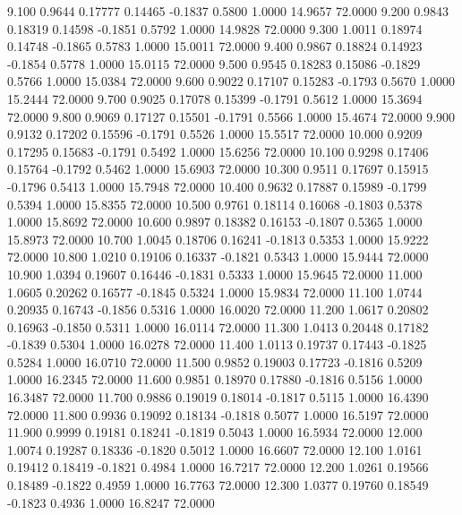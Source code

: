    9.100   0.9644   0.17777   0.14465  -0.1837   0.5800   1.0000  14.9657  72.0000
   9.200   0.9843   0.18319   0.14598  -0.1851   0.5792   1.0000  14.9828  72.0000
   9.300   1.0011   0.18974   0.14748  -0.1865   0.5783   1.0000  15.0011  72.0000
   9.400   0.9867   0.18824   0.14923  -0.1854   0.5778   1.0000  15.0115  72.0000
   9.500   0.9545   0.18283   0.15086  -0.1829   0.5766   1.0000  15.0384  72.0000
   9.600   0.9022   0.17107   0.15283  -0.1793   0.5670   1.0000  15.2444  72.0000
   9.700   0.9025   0.17078   0.15399  -0.1791   0.5612   1.0000  15.3694  72.0000
   9.800   0.9069   0.17127   0.15501  -0.1791   0.5566   1.0000  15.4674  72.0000
   9.900   0.9132   0.17202   0.15596  -0.1791   0.5526   1.0000  15.5517  72.0000
  10.000   0.9209   0.17295   0.15683  -0.1791   0.5492   1.0000  15.6256  72.0000
  10.100   0.9298   0.17406   0.15764  -0.1792   0.5462   1.0000  15.6903  72.0000
  10.300   0.9511   0.17697   0.15915  -0.1796   0.5413   1.0000  15.7948  72.0000
  10.400   0.9632   0.17887   0.15989  -0.1799   0.5394   1.0000  15.8355  72.0000
  10.500   0.9761   0.18114   0.16068  -0.1803   0.5378   1.0000  15.8692  72.0000
  10.600   0.9897   0.18382   0.16153  -0.1807   0.5365   1.0000  15.8973  72.0000
  10.700   1.0045   0.18706   0.16241  -0.1813   0.5353   1.0000  15.9222  72.0000
  10.800   1.0210   0.19106   0.16337  -0.1821   0.5343   1.0000  15.9444  72.0000
  10.900   1.0394   0.19607   0.16446  -0.1831   0.5333   1.0000  15.9645  72.0000
  11.000   1.0605   0.20262   0.16577  -0.1845   0.5324   1.0000  15.9834  72.0000
  11.100   1.0744   0.20935   0.16743  -0.1856   0.5316   1.0000  16.0020  72.0000
  11.200   1.0617   0.20802   0.16963  -0.1850   0.5311   1.0000  16.0114  72.0000
  11.300   1.0413   0.20448   0.17182  -0.1839   0.5304   1.0000  16.0278  72.0000
  11.400   1.0113   0.19737   0.17443  -0.1825   0.5284   1.0000  16.0710  72.0000
  11.500   0.9852   0.19003   0.17723  -0.1816   0.5209   1.0000  16.2345  72.0000
  11.600   0.9851   0.18970   0.17880  -0.1816   0.5156   1.0000  16.3487  72.0000
  11.700   0.9886   0.19019   0.18014  -0.1817   0.5115   1.0000  16.4390  72.0000
  11.800   0.9936   0.19092   0.18134  -0.1818   0.5077   1.0000  16.5197  72.0000
  11.900   0.9999   0.19181   0.18241  -0.1819   0.5043   1.0000  16.5934  72.0000
  12.000   1.0074   0.19287   0.18336  -0.1820   0.5012   1.0000  16.6607  72.0000
  12.100   1.0161   0.19412   0.18419  -0.1821   0.4984   1.0000  16.7217  72.0000
  12.200   1.0261   0.19566   0.18489  -0.1822   0.4959   1.0000  16.7763  72.0000
  12.300   1.0377   0.19760   0.18549  -0.1823   0.4936   1.0000  16.8247  72.0000
